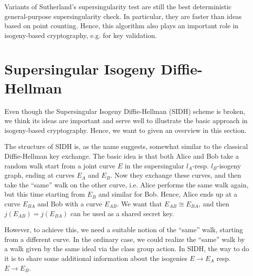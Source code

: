 Variants of Sutherland's supersingularity test are still the best deterministic general-purpose supersingularity check.
In particular, they are faster than ideas based on point counting.
Hence, this algorithm also plays an important role in isogeny-based cryptography, e.g. for key validation.

\section{Supersingular Isogeny Diffie-Hellman}
Even though the Supersingular Isogeny Diffie-Hellman (SIDH) scheme is broken, we think its ideas are important and serve well to illustrate the basic approach in isogeny-based cryptography.
Hence, we want to given an overview in this section.

The structure of SIDH is, as the name suggests, somewhat similar to the classical Diffie-Hellman key exchange.
The basic idea is that both Alice and Bob take a random walk start from a joint curve $E$ in the supersingular $l_A$-resp. $l_B$-isogeny graph, ending at curves $E_A$ and $E_B$.
Now they exchange these curves, and then take the ``same'' walk on the other curve, i.e. Alice performs the same walk again, but this time starting from $E_B$ and similar for Bob.
Hence, Alice ends up at a curve $E_{BA}$ and Bob with a curve $E_{AB}$.
We want that $E_{AB} \cong E_{BA}$, and then $j(E_{AB}) = j(E_{BA})$ can be used as a shared secret key.

However, to achieve this, we need a suitable notion of the ``same'' walk, starting from a different curve.
In the ordinary case, we could realize the ``same'' walk by a walk given by the same ideal via the class group action.
In SIDH, the way to do it is to share some additional information about the isogenies $E \to E_A$ resp. $E \to E_B$.

